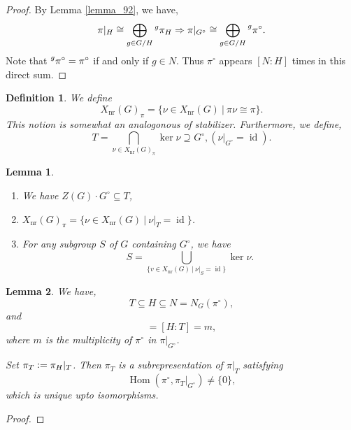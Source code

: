 \documentclass[8pt]{article}
\newtheorem{definition}{Definition}[section]
\newtheorem{lemma}{Lemma}[section]
\DeclareMathOperator{\Hom}{Hom}
\DeclareMathOperator{\id}{id}
\DeclareMathOperator{\nr}{nr}
\newcommand{\defeq}{\vcentcolon=}
\newcommand{\sep}[0]{\:|\:}
\begin{document}
  \begin{proof}
    By Lemma \ref{lemma_92}, we have,
    \begin{equation*}
      \pi|_H\cong\bigoplus_{g\in G/H}\prescript{g}{}{\pi_H}\Rightarrow\pi|_{G^\circ}\cong\bigoplus_{g\in G/H}\prescript{g}{}{\pi^\circ}.
    \end{equation*}
    Note that $\prescript{g}{}{\pi^\circ} = \pi^\circ$ if and only if $g\in N$. Thus $\pi^\circ$ appears $[N:H]$ times in this direct sum.
  \end{proof}
  \begin{definition}
    We define 
    \begin{equation*}
      X_{\nr}(G)_\pi = \{\nu\in X_{\nr}(G)\sep \pi\nu\cong\pi\}.
    \end{equation*}
    This notion is somewhat an analogonous of stabilizer. Furthermore, we define,
    \begin{equation*}
      T = \bigcap_{\nu\in X_{\nr}(G)_\pi}\ker\nu \supseteq G^\circ, (\nu|_{G^\circ}=\id).
    \end{equation*}
  \end{definition}
  \begin{lemma}$\:$
    \label{lemma_94}
    \begin{enumerate}
      \item We have $Z(G)\cdot G^\circ\subseteq T$,
      \item $X_{\nr}(G)_{\pi} = \{\nu\in X_{\nr}(G)\sep \nu|_T = \id\}$. 
      \item For any subgroup $S$ of $G$ containing $G^\circ$, we have 
      \begin{equation*}
        S = \bigcup_{\{v\in X_{\nr}(G)\sep \nu|_S=\id\}}\ker\nu.
      \end{equation*}
    \end{enumerate}
  \end{lemma}


  \begin{lemma}
    \label{lemma_95}
    We have,
    \begin{equation*}
      T\subseteq H\subseteq N=N_G(\pi^\circ),
    \end{equation*}
    and 
    \begin{equation*}
      [N:H]=[H:T] = m,
    \end{equation*}
    where $m$ is the multiplicity of $\pi^\circ$ in $\pi|_{G^\circ}$.
    \par Set $\pi_T\defeq\pi_H|_T$. Then $\pi_T$ is a subrepresentation of $\pi|_T$ satisfying 
    \begin{equation*}
      \Hom(\pi^\circ,\pi_T|_{G^\circ})\not=\{0\},
    \end{equation*}
    which is unique upto isomorphisms.
  \end{lemma}
  \begin{proof}
  \end{proof}
\end{document}
